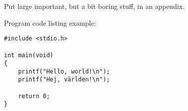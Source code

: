 
Put large important, but a bit boring stuff, in an appendix.

Program code listing example:

\begin{verbatim}
#include <stdio.h>

int main(void)
{
    printf("Hello, world!\n");
    printf("Hej, världen!\n");

    return 0;
}
\end{verbatim}
